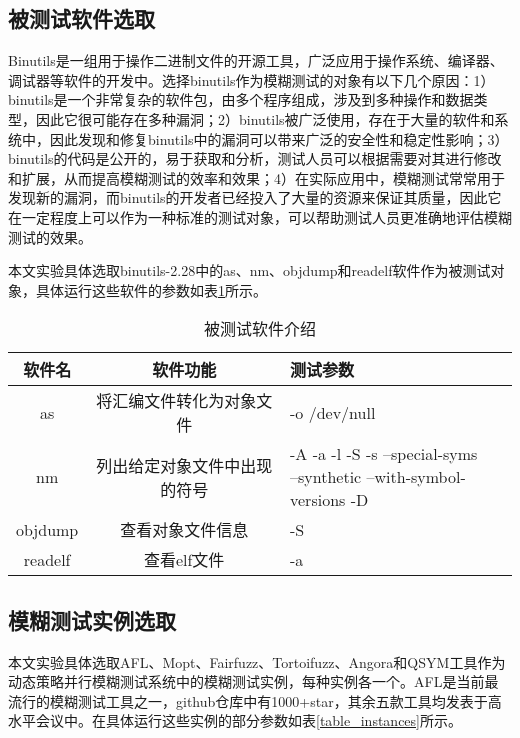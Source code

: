 \documentclass[master]{thesis-uestc}
\begin{document}
\subsection{被测试软件选取}

Binutils是一组用于操作二进制文件的开源工具，广泛应用于操作系统、编译器、调试器等软件的开发中。选择binutils作为模糊测试的对象有以下几个原因：1）binutils是一个非常复杂的软件包，由多个程序组成，涉及到多种操作和数据类型，因此它很可能存在多种漏洞；2）binutils被广泛使用，存在于大量的软件和系统中，因此发现和修复binutils中的漏洞可以带来广泛的安全性和稳定性影响；3）binutils的代码是公开的，易于获取和分析，测试人员可以根据需要对其进行修改和扩展，从而提高模糊测试的效率和效果；4）在实际应用中，模糊测试常常用于发现新的漏洞，而binutils的开发者已经投入了大量的资源来保证其质量，因此它在一定程度上可以作为一种标准的测试对象，可以帮助测试人员更准确地评估模糊测试的效果。

本文实验具体选取binutils-2.28中的as、nm、objdump和readelf软件作为被测试对象，具体运行这些软件的参数如表\ref{table_targets}所示。

\begin{table}[!htbp]
    \caption{被测试软件介绍}
    \begin{tabular}{ccl}
    \toprule
    软件名 & 软件功能 & 测试参数 \\
    \midrule
    as & 将汇编文件转化为对象文件 & -o /dev/null \\
    nm & 列出给定对象文件中出现的符号 & \makecell[l]{-A -a -l -S -s --special-syms \\--synthetic --with-symbol-versions -D}  \\
    objdump & 查看对象文件信息 & -S \\
    readelf & 查看elf文件 & -a \\
    \bottomrule
    \end{tabular}
    \label{table_targets}
    \vspace{6pt}
\end{table}


\subsection{模糊测试实例选取}

本文实验具体选取AFL、Mopt、Fairfuzz、Tortoifuzz、Angora和QSYM工具作为动态策略并行模糊测试系统中的模糊测试实例，每种实例各一个。AFL是当前最流行的模糊测试工具之一，github仓库中有1000+star，其余五款工具均发表于高水平会议中。在具体运行这些实例的部分参数如表\ref{table_instances}所示。
\end{document}
